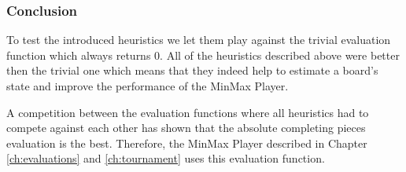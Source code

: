 \subsubsection*{Conclusion}
To test the introduced heuristics we let them play against the trivial evaluation function which always returns 0. All of the heuristics described above were better then the trivial one which means that they indeed help to estimate a board's state and improve the performance of the MinMax Player.

A competition between the evaluation functions where all heuristics had to compete against each other has shown that the absolute completing pieces evaluation is the best. Therefore, the MinMax Player described in Chapter \ref{ch:evaluations} and \ref{ch:tournament} uses this evaluation function.
